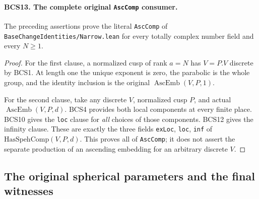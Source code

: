 \documentclass[11pt,a4paper]{article}
\numberwithin{equation}{section}
\theoremstyle{remark}\newtheorem{remark}[theorem]{Remark}
\begin{document}
\paragraph{BCS13. The complete original \texttt{Asc\allowbreak Comp} consumer.}
\label{claim:BCS13}
The preceding assertions prove the literal \texttt{Asc\allowbreak Comp} of
\texttt{Base\allowbreak Change\allowbreak Identities/\allowbreak Narrow.\allowbreak lean} for every totally complex
number field and every \(N\ge1\).
\begin{proof}
For the first clause, a normalized cusp of rank \(a=N\) has
\(V=P.V\) discrete by BCS1.  At length one the unique exponent
is zero, the parabolic is the whole group, and the identity inclusion
is the original \(\operatorname{AscEmb}(V,P,1)\).

For the second clause, take any discrete \(V\), normalized cusp
\(P\), and actual \(\operatorname{AscEmb}(V,P,d)\).
BCS4 provides both local components at every finite place.
BCS10 gives the \texttt{loc} clause for \emph{all} choices of
those components.  BCS12 gives the infinity clause.  These are
exactly the three fields \texttt{ex\allowbreak Loc}, \texttt{loc}, \texttt{inf}
of \(\mathrm{HasSpehComp}(V,P,d)\).  This proves all of
\texttt{Asc\allowbreak Comp}; it does not assert the separate production of an
ascending embedding for an arbitrary discrete \(V\).
\end{proof}

\subsection{The original spherical parameters and the final witnesses}

\end{document}
